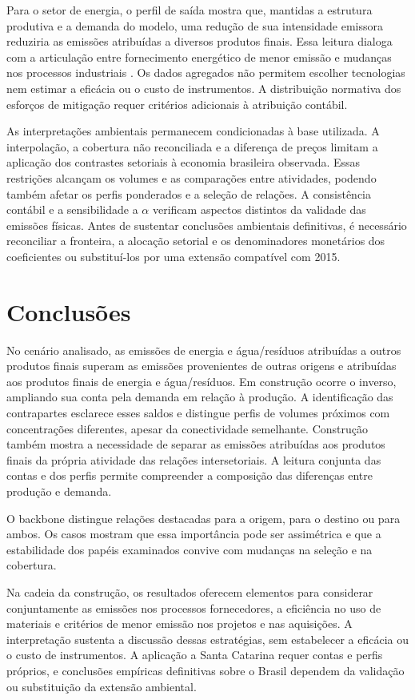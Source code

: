 \documentclass[12pt]{article}
\begin{document}
Para o setor de energia, o perfil de saída mostra que, mantidas a estrutura produtiva e a demanda do modelo, uma redução de sua intensidade emissora reduziria as emissões atribuídas a diversos produtos finais. Essa leitura dialoga com a articulação entre fornecimento energético de menor emissão e mudanças nos processos industriais \parencite[seções~4.2 e~7.2]{rissman2020}. Os dados agregados não permitem escolher tecnologias nem estimar a eficácia ou o custo de instrumentos. A distribuição normativa dos esforços de mitigação requer critérios adicionais à atribuição contábil.

As interpretações ambientais permanecem condicionadas à base utilizada. A interpolação, a cobertura não reconciliada e a diferença de preços limitam a aplicação dos contrastes setoriais à economia brasileira observada. Essas restrições alcançam os volumes e as comparações entre atividades, podendo também afetar os perfis ponderados e a seleção de relações. A consistência contábil e a sensibilidade a $\alpha$ verificam aspectos distintos da validade das emissões físicas. Antes de sustentar conclusões ambientais definitivas, é necessário reconciliar a fronteira, a alocação setorial e os denominadores monetários dos coeficientes ou substituí-los por uma extensão compatível com 2015.

\clearpage
\section{Conclusões}

No cenário analisado, as emissões de energia e água/resíduos atribuídas a outros produtos finais superam as emissões provenientes de outras origens e atribuídas aos produtos finais de energia e água/resíduos. Em construção ocorre o inverso, ampliando sua conta pela demanda em relação à produção. A identificação das contrapartes esclarece esses saldos e distingue perfis de volumes próximos com concentrações diferentes, apesar da conectividade semelhante. Construção também mostra a necessidade de separar as emissões atribuídas aos produtos finais da própria atividade das relações intersetoriais. A leitura conjunta das contas e dos perfis permite compreender a composição das diferenças entre produção e demanda.

O backbone distingue relações destacadas para a origem, para o destino ou para ambos. Os casos mostram que essa importância pode ser assimétrica e que a estabilidade dos papéis examinados convive com mudanças na seleção e na cobertura.

Na cadeia da construção, os resultados oferecem elementos para considerar conjuntamente as emissões nos processos fornecedores, a eficiência no uso de materiais e critérios de menor emissão nos projetos e nas aquisições. A interpretação sustenta a discussão dessas estratégias, sem estabelecer a eficácia ou o custo de instrumentos. A aplicação a Santa Catarina requer contas e perfis próprios, e conclusões empíricas definitivas sobre o Brasil dependem da validação ou substituição da extensão ambiental.

\clearpage
\begingroup
{}
\raggedright
\printbibliography[title={Referências}]
\endgroup

\end{document}
